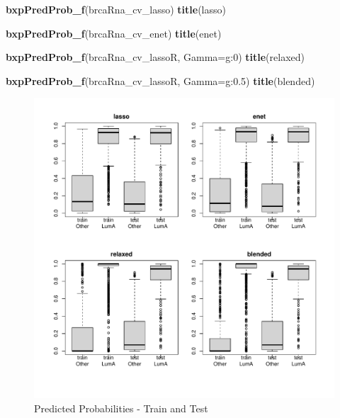 \documentclass[
]{book}
\newenvironment{Shaded}{\begin{snugshade}}{\end{snugshade}}
\newcommand{\DataTypeTok}[1]{\textcolor[rgb]{0.13,0.29,0.53}{#1}}
\newcommand{\KeywordTok}[1]{\textcolor[rgb]{0.13,0.29,0.53}{\textbf{#1}}}
\newcommand{\NormalTok}[1]{#1}
\newcommand{\StringTok}[1]{\textcolor[rgb]{0.31,0.60,0.02}{#1}}
\begin{document}
\begin{Shaded}
\begin{Highlighting}[]
\KeywordTok{bxpPredProb\_f}\NormalTok{(brcaRna\_cv\_lasso)}
\KeywordTok{title}\NormalTok{(}\StringTok{\textquotesingle{}lasso\textquotesingle{}}\NormalTok{)}

\KeywordTok{bxpPredProb\_f}\NormalTok{(brcaRna\_cv\_enet)}
\KeywordTok{title}\NormalTok{(}\StringTok{\textquotesingle{}enet\textquotesingle{}}\NormalTok{)}

\KeywordTok{bxpPredProb\_f}\NormalTok{(brcaRna\_cv\_lassoR, }\DataTypeTok{Gamma=}\StringTok{\textquotesingle{}g:0\textquotesingle{}}\NormalTok{)}
\KeywordTok{title}\NormalTok{(}\StringTok{\textquotesingle{}relaxed\textquotesingle{}}\NormalTok{)}

\KeywordTok{bxpPredProb\_f}\NormalTok{(brcaRna\_cv\_lassoR, }\DataTypeTok{Gamma=}\StringTok{\textquotesingle{}g:0.5\textquotesingle{}}\NormalTok{)}
\KeywordTok{title}\NormalTok{(}\StringTok{\textquotesingle{}blended\textquotesingle{}}\NormalTok{)}
\end{Highlighting}
\end{Shaded}

\begin{figure}
\centering
\includegraphics{Static/figures/brcaRna-glmnetFit-fitPrevalByGroup-1.pdf}
\caption{\label{fig:brcaRna-glmnetFit-fitPrevalByGroup}Predicted Probabilities - Train and Test}
\end{figure}
\end{document}
